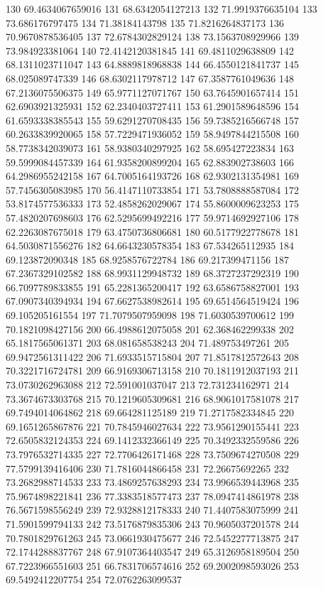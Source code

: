 {130 69.4634067659016
131 68.6342054127213
132 71.9919376635104
133 73.686176797475
134 71.38184143798
135 71.8216264837173
136 70.9670878536405
137 72.6784302829124
138 73.1563708929966
139 73.984923381064
140 72.4142120381845
141 69.4811029638809
142 68.1311023711047
143 64.8889818968838
144 66.4550121841737
145 68.025089747339
146 68.6302117978712
147 67.3587761049636
148 67.2136075506375
149 65.9771127071767
150 63.7645901657414
151 62.6903921325931
152 62.2340403727411
153 61.2901589648596
154 61.6593338385543
155 59.6291270708435
156 59.7385216566748
157 60.2633839920065
158 57.7229471936052
159 58.9497844215508
160 58.7738342039073
161 58.9380340297925
162 58.695427223834
163 59.5999084457339
164 61.9358200899204
165 62.883902738603
166 64.2986955242158
167 64.7005164193726
168 62.9302131354981
169 57.7456305083985
170 56.4147110733854
171 53.7808888587084
172 53.8174577536333
173 52.4858262029067
174 55.8600009623253
175 57.4820207698603
176 62.5295699492216
177 59.9714692927106
178 62.2263087675018
179 63.4750736806681
180 60.5177922778678
181 64.5030871556276
182 64.6643230578354
183 67.534265112935
184 69.123872090348
185 68.9258576722784
186 69.217399471156
187 67.2367329102582
188 68.9931129948732
189 68.3727237292319
190 66.7097789833855
191 65.2281365200417
192 63.6586758827001
193 67.0907340394934
194 67.6627538982614
195 69.6514564519424
196 69.105205161554
197 71.7079507959098
198 71.6030539700612
199 70.1821098427156
200 66.4988612075058
201 62.368462299338
202 65.1817565061371
203 68.081658538243
204 71.489753497261
205 69.9472561311422
206 71.6933515715804
207 71.8517812572643
208 70.3221716724781
209 66.9169306713158
210 70.1811912037193
211 73.0730262963088
212 72.591001037047
213 72.731234162971
214 73.3674673303768
215 70.1219605309681
216 68.9061017581078
217 69.7494014064862
218 69.664281125189
219 71.2717582334845
220 69.1651265867876
221 70.7845946027634
222 73.9561290155441
223 72.6505832124353
224 69.1412332366149
225 70.3492332559586
226 73.7976532714335
227 72.7706426171468
228 73.7509674270508
229 77.5799139416406
230 71.7816044866458
231 72.26675692265
232 73.2682988714533
233 73.4869257638293
234 73.9966539443968
235 75.9674898221841
236 77.3383518577473
237 78.0947414861978
238 76.5671598556249
239 72.9328812178333
240 71.4407583075999
241 71.5901599794133
242 73.5176879835306
243 70.9605037201578
244 70.7801829761263
245 73.0661930475677
246 72.5452277713875
247 72.1744288837767
248 67.9107364403547
249 65.3126958189504
250 67.7223966551603
251 66.7831706574616
252 69.2002098593026
253 69.5492412207754
254 72.0762263099537
}

